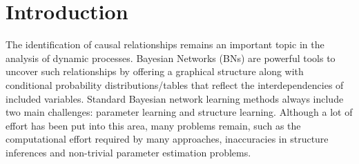 \documentclass{article}
\begin{document}
\section{Introduction}
\label{sec:intro}
The identification of causal relationships %
remains an
important topic in the analysis of dynamic processes. %
Bayesian Networks \cite{heckerman95} (BNs) are powerful tools to uncover such relationships by offering a graphical structure along with conditional probability
distributions/tables that reflect the interdependencies of included variables.
% 
Standard Bayesian network learning methods always include two main challenges:
 parameter learning and structure learning. 
Although a lot of effort has been put into this area, many problems remain,
such as the computational effort required by many approaches, inaccuracies in structure inferences and non-trivial parameter estimation problems. 
\end{document}
